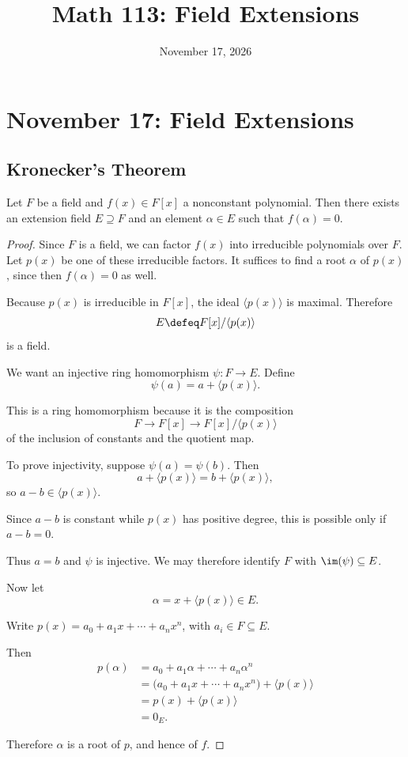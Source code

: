 \documentclass[main.tex]{subfiles}
\title{Math 113: Field Extensions}
\author{\defaultauthor}
\date{November 17, 2026}
\begin{document}
\ifSubfilesClassLoaded{\maketitle}{}

\section{November 17: Field Extensions}

\subsection{Kronecker's Theorem}

\begin{theorem}
Let $F$ be a field and $f(x)\in F[x]$ a nonconstant polynomial.
Then there exists an extension field $E\supseteq F$ and an element
$\alpha\in E$ such that $f(\alpha)=0$.
\end{theorem}

\begin{proof}
Since $F$ is a field, we can factor $f(x)$ into irreducible
polynomials over $F$. Let $p(x)$ be one of these irreducible factors.
It suffices to find a root $\alpha$ of $p(x)$, since then
$f(\alpha)=0$ as well.

Because $p(x)$ is irreducible in $F[x]$, the ideal $\langle p(x)\rangle$
is maximal. Therefore
\[
E\defeq F[x]/\langle p(x)\rangle
\]
is a field.

We want an injective ring homomorphism $\psi:F\to E$. Define
\[
\psi(a)=a+\langle p(x)\rangle.
\]

This is a ring homomorphism because it is the composition
\[
F\longrightarrow F[x]\longrightarrow F[x]/\langle p(x)\rangle
\]
of the inclusion of constants and the quotient map.

To prove injectivity, suppose $\psi(a)=\psi(b)$. Then
\[
a+\langle p(x)\rangle=b+\langle p(x)\rangle,
\]
so $a-b\in\langle p(x)\rangle$.

Since $a-b$ is constant while $p(x)$ has positive degree, this
is possible only if $a-b=0$.

Thus $a=b$ and $\psi$ is injective. We may therefore identify
$F$ with $\im(\psi)\subseteq E$.

Now let
\[
\alpha=x+\langle p(x)\rangle\in E.
\]

Write $p(x)=a_0+a_1x+\cdots+a_nx^n$, with $a_i\in F\subseteq E$.

Then
\begin{align*}
p(\alpha)
 &=a_0+a_1\alpha+\cdots+a_n\alpha^n\\
 &=\bigl(a_0+a_1x+\cdots+a_nx^n\bigr)+\langle p(x)\rangle\\
 &=p(x)+\langle p(x)\rangle\\
 &=0_E.
\end{align*}

Therefore $\alpha$ is a root of $p$, and hence of $f$.
\end{proof}
\end{document}
